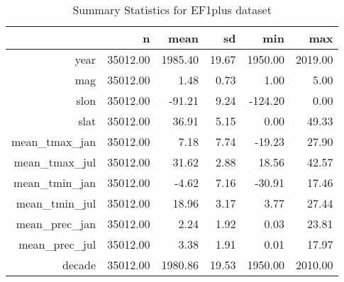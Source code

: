 \begin{table}[ht]
\centering
\caption{Summary Statistics for EF1plus dataset} 
\begin{tabular}{rrrrrr}
  \hline
 & n & mean & sd & min & max \\ 
  \hline
year & 35012.00 & 1985.40 & 19.67 & 1950.00 & 2019.00 \\ 
  mag & 35012.00 & 1.48 & 0.73 & 1.00 & 5.00 \\ 
  slon & 35012.00 & -91.21 & 9.24 & -124.20 & 0.00 \\ 
  slat & 35012.00 & 36.91 & 5.15 & 0.00 & 49.33 \\ 
  mean\_tmax\_jan & 35012.00 & 7.18 & 7.74 & -19.23 & 27.90 \\ 
  mean\_tmax\_jul & 35012.00 & 31.62 & 2.88 & 18.56 & 42.57 \\ 
  mean\_tmin\_jan & 35012.00 & -4.62 & 7.16 & -30.91 & 17.46 \\ 
  mean\_tmin\_jul & 35012.00 & 18.96 & 3.17 & 3.77 & 27.44 \\ 
  mean\_prec\_jan & 35012.00 & 2.24 & 1.92 & 0.03 & 23.81 \\ 
  mean\_prec\_jul & 35012.00 & 3.38 & 1.91 & 0.01 & 17.97 \\ 
  decade & 35012.00 & 1980.86 & 19.53 & 1950.00 & 2010.00 \\ 
   \hline
\end{tabular}
\end{table}
